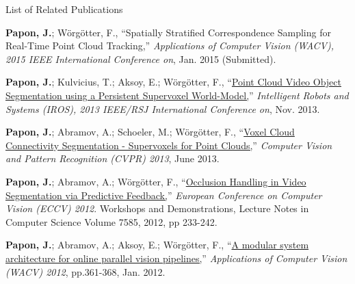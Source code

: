 
\noindent
\begin{flushright}
\huge List of Related Publications
\end{flushright} 
\vspace{50pt} 

\hangindent=1.5cm \textbf{Papon, J.};  Wörgötter, F., ``{Spatially Stratified Correspondence Sampling for Real-Time Point Cloud Tracking,}'' \emph{Applications of Computer Vision (WACV), 2015 IEEE International Conference on}, Jan. 2015 (Submitted). \\
\vspace{6pt}

\hangindent=1.5cm \textbf{Papon, J.};  Kulvicius, T.; Aksoy, E.; Wörgötter, F., ``\href{http://www.dpi.physik.uni-goettingen.de/cns/uploads_bibtexmodule/PDF/paponkulviciusaksoy2013.pdf}{Point Cloud Video Object Segmentation using a Persistent Supervoxel World-Model,}'' \emph{Intelligent Robots and Systems (IROS), 2013 IEEE/RSJ International Conference on}, Nov. 2013. \\
\vspace{6pt}

\hangindent=1.5cm \textbf{Papon, J.};  Abramov, A.; Schoeler, M.; Wörgötter, F., ``\href{http://www.cv-foundation.org/openaccess/content_cvpr_2013/papers/Papon_Voxel_Cloud_Connectivity_2013_CVPR_paper.pdf}{Voxel Cloud Connectivity Segmentation - Supervoxels for Point Clouds,}'' \emph{Computer Vision and Pattern Recognition (CVPR) 2013}, June 2013. \\
\vspace{6pt}

\hangindent=1.5cm \textbf{Papon, J.};  Abramov, A.; Wörgötter, F., ``\href{http://dx.doi.org/10.1007/978-3-642-33885-4_24}{Occlusion Handling in Video Segmentation via Predictive Feedback,}'' \emph{European Conference on Computer Vision (ECCV) 2012}. Workshops and Demonstrations, Lecture Notes in Computer Science Volume 7585, 2012, pp 233-242. \\
\vspace{6pt}

\hangindent=1.5cm \textbf{Papon, J.};  Abramov, A.; Aksoy, E.; Wörgötter, F., ``\href{http://dx.doi.org/10.1109/WACV.2012.6163002}{A modular system architecture for online parallel vision pipelines,}'' \emph{Applications of Computer Vision (WACV) 2012}, pp.361-368, Jan. 2012. \\
\vspace{6pt}

